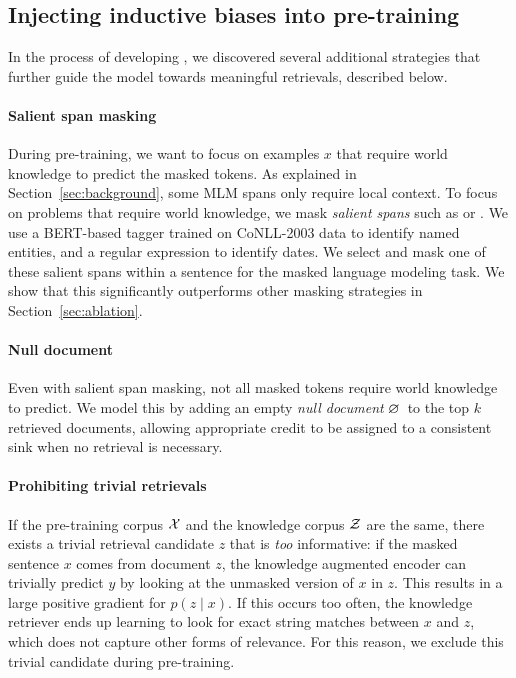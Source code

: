 \documentclass{article}
\begin{document}
\subsection{Injecting inductive biases into pre-training} \label{sec:inductive-bias}
In the process of developing \thename, we discovered several additional strategies that further guide the model towards meaningful retrievals, described below.

\paragraph{Salient span masking}
During \thename pre-training, we want to focus on examples $x$ that require world knowledge to predict the masked tokens. As explained in Section~\ref{sec:background}, some MLM spans only require local context. To focus on problems that require world knowledge, we mask \emph{salient spans} such as  or . We use a BERT-based tagger trained on CoNLL-2003 data \cite{conll_ner} to identify named entities, and a regular expression to identify dates. We select and mask one of these salient spans within a sentence for the masked language modeling task. We show that this significantly outperforms other masking strategies in Section~\ref{sec:ablation}.

\paragraph{Null document}
Even with salient span masking, not all masked tokens require world knowledge to predict. We model this by adding an empty \emph{null document} $\varnothing$~to the top $k$ retrieved documents, allowing appropriate credit to be assigned to a consistent sink when no retrieval is necessary.

\paragraph{Prohibiting trivial retrievals}
If the pre-training corpus $\mathcal{X}$ and the knowledge corpus $\mathcal{Z}$ are the same, there exists a trivial retrieval candidate $z$ that is \emph{too} informative: if the masked sentence $x$ comes from document $z$, the knowledge augmented encoder can trivially predict $y$ by looking at the unmasked version of $x$ in $z$. This results in a large positive gradient for $p(z\mid x)$. If this occurs too often, the knowledge retriever ends up learning to look for exact string matches between $x$ and $z$, which does not capture other forms of relevance. For this reason, we exclude this trivial candidate during pre-training.
\end{document}
